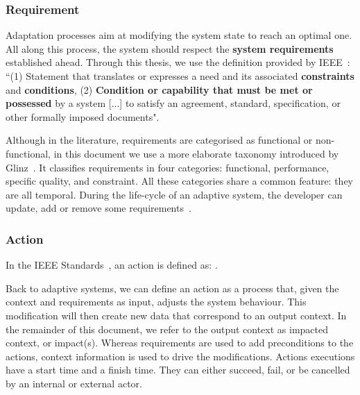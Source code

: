 \subsubsection{Requirement}
\label{sec:back:adapt:knowledge:req}

Adaptation processes aim at modifying the system state to reach an optimal one.
All along this process, the system should respect the \textbf{system requirements} established ahead. 
Through this thesis, we use the definition provided by IEEE~\cite{iso2017systems}: ``(1) Statement that translates or expresses a need and its associated \textbf{constraints} and \textbf{conditions}, (2) \textbf{Condition or capability that must be met or possessed} by a system [...] to satisfy an agreement, standard, specification, or other formally imposed documents".

Although in the literature, requirements are categorised as functional or non-func\-tional, in this document we use a more elaborate taxonomy introduced by Glinz~\cite{DBLP:conf/re/Glinz07}.
It classifies requirements in four categories: functional, performance, specific quality, and constraint.
All these categories share a common feature: they are all temporal.
During the life-cycle of an adaptive system, the developer can update, add or remove some requirements~\cite{DBLP:conf/icse/ChengA07, pandey2010effective}.

\subsubsection{Action}
In the IEEE Standards~\cite{iso2017systems}, an action is defined as: .

Back to adaptive systems, we can define an action as a process that, given the context and requirements as input, adjusts the system behaviour.
This modification will then create new data that correspond to an output context. In the remainder of this document, we refer to the output context as impacted context, or impact(s).
Whereas requirements are used to add preconditions to the actions, context information is used to drive the modifications.
Actions executions have a start time and a finish time. They can either succeed, fail, or be cancelled by an internal or external actor.

